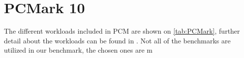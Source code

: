 \section{PCMark 10}
The different workloads included in PCM are shown on \cref{tab:PCMark}, further detail about the workloads can be found in \cite{pcmark}. Not all of the benchmarks are utilized in our benchmark, the chosen ones are m

